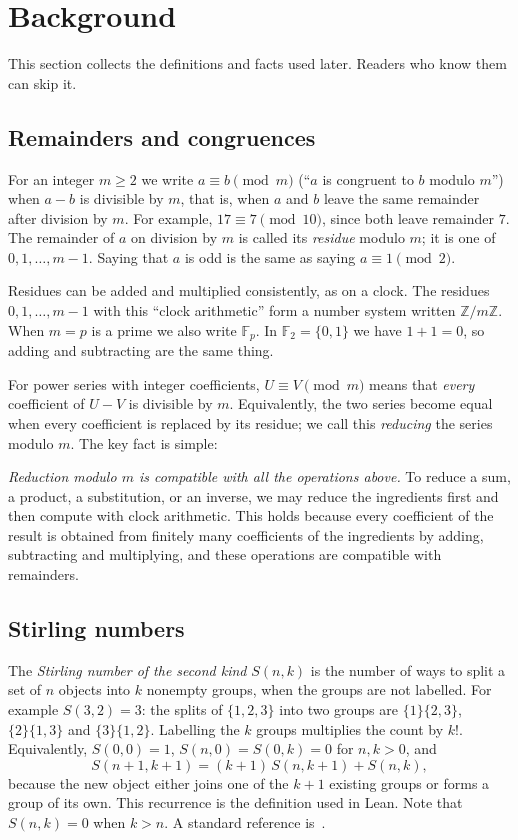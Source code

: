\documentclass[11pt,a4paper]{article}
\theoremstyle{definition}
\theoremstyle{remark}
\newcommand{\Z}{\mathbb{Z}}
\newcommand{\F}{\mathbb{F}}
\begin{document}
\section{Background}\label{sec:background}
This section collects the definitions and facts used later. Readers who know them can skip it.
\subsection{Remainders and congruences}
For an integer $m\ge2$ we write $a\equiv b\pmod m$ (``$a$ is congruent to $b$ modulo $m$'') when $a-b$ is divisible by
$m$, that is, when $a$ and $b$ leave the same remainder after division by $m$. For example, $17\equiv7\pmod{10}$, since both leave remainder $7$. The
remainder of $a$ on division by $m$ is called its \emph{residue} modulo $m$; it is one of $0,1,\dots,m-1$. Saying that
$a$ is odd is the same as saying $a\equiv1\pmod2$.

Residues can be added and multiplied consistently, as on a clock. The residues $0,1,\dots,m-1$ with this ``clock
arithmetic'' form a number system written $\Z/m\Z$. When $m=p$ is a prime we also write $\F_p$. In $\F_2=\{0,1\}$ we
have $1+1=0$, so adding and subtracting are the same thing.

For power series with integer coefficients, $U\equiv V\pmod m$ means that \emph{every} coefficient of $U-V$ is
divisible by $m$. Equivalently, the two series become equal when every coefficient is replaced by its residue; we call
this \emph{reducing} the series modulo $m$. The key fact is simple:

\emph{Reduction modulo $m$ is compatible with all the operations above.} To reduce a sum, a product, a substitution, or
an inverse, we may reduce the ingredients first and then compute with clock arithmetic. This holds because every
coefficient of the result is obtained from finitely many coefficients of the ingredients by adding, subtracting and
multiplying, and these operations are compatible with remainders.

\subsection{Stirling numbers}
The \emph{Stirling number of the second kind} $S(n,k)$ is the number of ways to split a set of $n$ objects into $k$
nonempty groups, when the groups are not labelled. For example $S(3,2)=3$: the splits of $\{1,2,3\}$ into two groups
are $\{1\}\{2,3\}$, $\{2\}\{1,3\}$ and $\{3\}\{1,2\}$. Labelling the $k$ groups multiplies the count by $k!$. Equivalently,
$S(0,0)=1$, $S(n,0)=S(0,k)=0$ for $n,k>0$, and
\[
S(n+1,k+1)=(k+1)\,S(n,k+1)+S(n,k),
\]
because the new object either joins one of the $k+1$ existing groups or forms a group of its own. This recurrence is the
definition used in Lean. Note that $S(n,k)=0$ when $k>n$. A standard reference is~\cite{concrete}.
\end{document}
